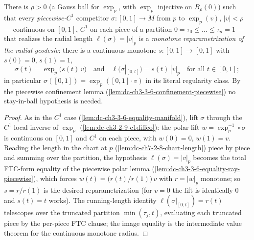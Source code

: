 \begin{lemma}
  \label{lem:dc-ch3-3-6-equality-manifold-piecewise}


  There is $\rho>0$ (a Gauss ball for $\exp_p$, with $\exp_p$ injective on
  $B_\rho(0)$) such that every \emph{piecewise-$C^1$} competitor
  $\sigma:[0,1]\to M$ from $p$ to $\exp_p(v)$, $|v|<\rho$ — continuous on
  $[0,1]$, $C^1$ on each piece of a partition $0=\tau_0\le\dots\le\tau_n=1$ —
  that realizes the radial length $\ell(\sigma)=|v|_p$ is a \emph{monotone
  reparametrization of the radial geodesic}: there is a continuous monotone
  $s:[0,1]\to[0,1]$ with $s(0)=0$, $s(1)=1$,
  $$\sigma(t)=\exp_p\big(s(t)\,v\big)\quad\text{and}\quad
    \ell\big(\sigma|_{[0,t]}\big)=s(t)\,|v|_p\quad\text{for all }t\in[0,1];$$
  in particular $\sigma([0,1])=\exp_p([0,1]\cdot v)$ in its literal regularity
  class. By the piecewise
  confinement lemma (\cref{lem:dc-ch3-3-6-confinement-piecewise}) no
  stay-in-ball hypothesis is needed.
\end{lemma}
\begin{proof}
  \sketch

  As in the $C^1$ case (\cref{lem:dc-ch3-3-6-equality-manifold}), lift
  $\sigma$ through the $C^1$ local inverse of $\exp_p$
  (\cref{lem:dc-ch3-2-9-c1diffeo}): the polar lift $w=\exp_p^{-1}\circ\sigma$
  is continuous on $[0,1]$ and $C^1$ on each piece, with $w(0)=0$,
  $w(1)=v$. Reading the length in the chart at $p$
  (\cref{lem:dc-ch7-2-8-chart-length}) piece by piece and summing over the
  partition, the hypothesis $\ell(\sigma)=|v|_p$ becomes the total FTC-form
  equality of the piecewise polar lemma
  (\cref{lem:dc-ch3-3-6-equality-ray-piecewise}), which forces
  $w(t)=\bigl(r(t)/r(1)\bigr)\,v$ with $r=|w|_p$ monotone; so $s=r/r(1)$ is
  the desired reparametrization (for $v=0$ the lift is identically $0$ and
  $s(t)=t$ works). The running-length identity
  $\ell(\sigma|_{[0,t]})=r(t)$ telescopes over the truncated partition
  $\min(\tau_j,t)$, evaluating each truncated piece by the per-piece FTC
  clause; the image equality is the intermediate value theorem for the
  continuous monotone radius.
\end{proof}

